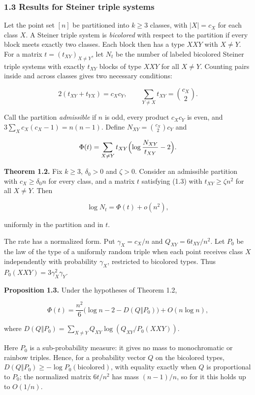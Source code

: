 \documentclass[english,11pt,a4paper]{article}
\begin{document}
\subsubsection{1.3 Results for Steiner triple systems}\label{results-for-steiner-triple-systems}

Let the point set \([n]\) be partitioned into \(k\ge3\) classes, with \(|X|=c_X\) for each class \(X\). A Steiner triple system is \emph{bicolored} with respect to the partition if every block meets exactly two classes. Each block then has a type \(XXY\) with \(X\ne Y\). For a matrix \(t=(t_{XY})_{X\ne Y}\), let \(N_t\) be the number of labeled bicolored Steiner triple systems with exactly \(t_{XY}\) blocks of type \(XXY\) for all \(X\ne Y\). Counting pairs inside and across classes gives two necessary conditions:

\nopagebreak[4]
\[2(t_{XY}+t_{YX})=c_Xc_Y,\qquad \sum_{Y\ne X}t_{XY}=\binom{c_X}{2}.\tag{1.3}\]

Call the partition \emph{admissible} if \(n\) is odd, every product \(c_Xc_Y\) is even, and \(3\sum_X c_X(c_X-1)=n(n-1)\). Define \(N_{XY}=\binom{c_X}{2}c_Y\) and

\nopagebreak[4]
\[\Phi(t)=\sum_{X\ne Y}t_{XY}\Bigl(\log\frac{N_{XY}}{t_{XY}}-2\Bigr).\]

\textbf{Theorem 1.2.} Fix \(k\ge3\), \(\delta_0>0\) and \(\zeta>0\). Consider an admissible partition with \(c_X\ge\delta_0 n\) for every class, and a matrix \(t\) satisfying (1.3) with \(t_{XY}\ge\zeta n^2\) for all \(X\ne Y\). Then

\nopagebreak[4]
\[\log N_t=\Phi(t)+o(n^2),\]

uniformly in the partition and in \(t\).

The rate has a normalized form. Put \(\gamma_X=c_X/n\) and \(Q_{XY}=6t_{XY}/n^2\). Let \(P_0\) be the law of the type of a uniformly random triple when each point receives class \(X\) independently with probability \(\gamma_X\), restricted to bicolored types. Thus \(P_0(XXY)=3\gamma_X^2\gamma_Y\).

\textbf{Proposition 1.3.} Under the hypotheses of Theorem 1.2,

\nopagebreak[4]
\[\Phi(t)=\frac{n^2}{6}\bigl(\log n-2-D(Q\Vert P_0)\bigr)+O(n\log n),\]

where \(D(Q\Vert P_0)=\sum_{X\ne Y}Q_{XY}\log(Q_{XY}/P_0(XXY))\).

Here \(P_0\) is a sub-probability measure: it gives no mass to monochromatic or rainbow triples. Hence, for a probability vector \(Q\) on the bicolored types, \(D(Q\Vert P_0)\ge-\log P_0(\text{bicolored})\), with equality exactly when \(Q\) is proportional to \(P_0\); the normalized matrix \(6t/n^2\) has mass \((n-1)/n\), so for it this holds up to \(O(1/n)\).
\end{document}
